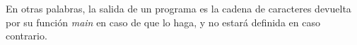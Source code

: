








En otras palabras, la salida de un programa es la cadena de caracteres devuelta por su función \emph{main} en caso de que lo haga, y no estará definida en caso contrario.


